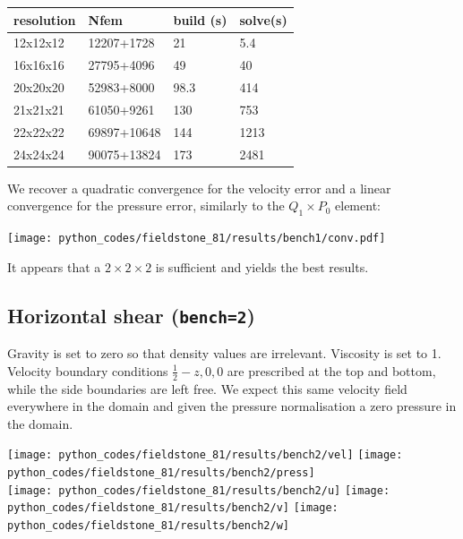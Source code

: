 \begin{center}
\begin{tabular}{llll}
\hline
resolution &Nfem           &build (s) &solve(s) \\
\hline\hline
12x12x12   &12207+1728     &21        &5.4\\
16x16x16   &27795+4096     &49        &40\\
20x20x20   &52983+8000     &98.3      &414\\
21x21x21   &61050+9261     &130       &753 \\
22x22x22   &69897+10648    &144       &1213\\
24x24x24   &90075+13824    &173       &2481\\
\hline
\end{tabular}
\end{center}
 
We recover a quadratic convergence for the velocity error and a linear convergence for the pressure error, 
similarly to the $Q_1\times P_0$ element:

\begin{center}
\texttt{[image: python\_codes/fieldstone\_81/results/bench1/conv.pdf]}
\end{center}

It appears that a $2 \times 2\times 2$ is sufficient and yields the best results.

\subsection*{Horizontal shear ({\tt bench=2})}

Gravity is set to zero so that density values are irrelevant. Viscosity is set to 1.
Velocity boundary conditions $\frac12-z,0,0$ are prescribed at the top and bottom, 
while the side boundaries are left free. We expect this same velocity field everywhere in the 
domain and given the pressure normalisation a zero pressure in the domain. 

\begin{center}
\texttt{[image: python\_codes/fieldstone\_81/results/bench2/vel]}
\texttt{[image: python\_codes/fieldstone\_81/results/bench2/press]}\\
\texttt{[image: python\_codes/fieldstone\_81/results/bench2/u]}
\texttt{[image: python\_codes/fieldstone\_81/results/bench2/v]}
\texttt{[image: python\_codes/fieldstone\_81/results/bench2/w]}
\end{center}

